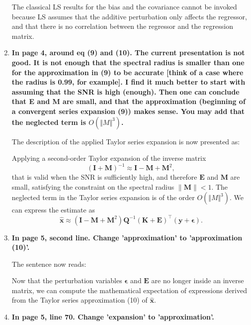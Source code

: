 \documentclass[11pt]{article}
\begin{document}
\begin{enumerate}
\color{blue} 
The classical LS results for the bias and the covariance cannot be invoked because LS assumes that the additive perturbation only affects the regressor, and that there is no correlation between the regressor and the regression matrix.
\color{black}


\item \textbf{In page 4, around eq (9) and (10). The current presentation is not good. It is not enough that the spectral radius is smaller than one for the approximation in (9) to be accurate [think of a case where the radius is 0.99, for example]. I find it much better to start with assuming that the SNR is high (enough).
Then one can conclude that E and M are small, and that the approximation (beginning of a convergent series expansion (9)) makes sense. You may add that the neglected term is $O(\Vert M \Vert^3)$.}

The description of the applied Taylor series expansion is now presented as:

\color{blue}
Applying a second-order Taylor expansion of the inverse matrix
\begin{equation} (\mathbf{I} + \mathbf{M})^{-1} \approx \mathbf{I} - \mathbf{M} + \mathbf{M}^2, \tag{9} \end{equation} 
 that is valid when the SNR is sufficiently high, and therefore $\mathbf{E}$ and $\mathbf{M}$ are small, satisfying the constraint on the spectral radius $\| \mathbf{M} \| < 1$. 
 The neglected term in the Taylor series expansion is of the order $O(\Vert M \Vert^3)$.
We can express the estimate as
\begin{equation} \widehat{\mathbf{x}} \approx \left( \mathbf{I} - \mathbf{M} + \mathbf{M}^2 \right) \mathbf{Q}^{-1} (\mathbf{K}+\mathbf{E})^\top (\mathbf{y}+\bm{\epsilon}). \tag{10} \end{equation} 
\color{black}

\item \textbf{In page 5, second line. Change 'approximation' to 'approximation (10)'.}

The sentence now reads:

\color{blue} 
Now that the perturbation variables $\bm{\epsilon}$ and $\mathbf{E}$ are no longer inside an inverse matrix, we can compute the mathematical expectation of expressions derived from the Taylor series approximation (10) of $\widehat{\mathbf{x}}$. 
\color{black} 

\item  \textbf{In page 5, line 70. Change 'expansion' to 'approximation'.}


\end{enumerate}
\end{document}

